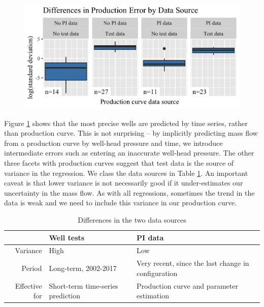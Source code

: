 \documentclass[a4paper, 12pt]{article}
\begin{document}
\begin{figure}
  \centering
  \includegraphics[width=.5\linewidth]{media/error_source}
  \label{fig:error_source}
\end{figure}

Figure \ref{fig:error_source} shows that the most precise wells are predicted by time series, rather than production curve. This is not surprising -- by implicitly predicting mass flow from a production curve by well-head pressure and time, we introduce intermediate errors such as entering an inaccurate well-head pressure. The other three facets with production curves suggest that test data is the source of variance in the regression. We class the data sources in Table \ref{tab:data_sources}. An important caveat is that lower variance is not necessarily good if it under-estimates our uncertainty in the mass flow. As with all regressions, sometimes the trend in the data is weak and we need to include this variance in our production curve.

\begin{table}
\centering
\begin{tabularx}{0.85\linewidth}{rXX}
\hline
 & Well tests & PI data \\ 
  \hline
Variance & High & Low  \\
Period & Long-term, 2002-2017 & Very recent, since the last change in configuration \\
Effective for & Short-term time-series prediction & Production curve and parameter estimation \\
   \hline
\end{tabularx}
\caption{Differences in the two data sources}
\label{tab:data_sources}
\end{table}
\end{document}
